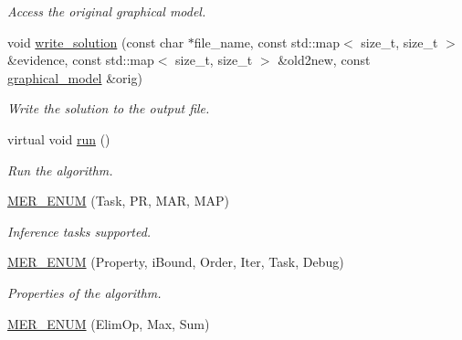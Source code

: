 \begin{DoxyCompactItemize}
\begin{DoxyCompactList}\small\item\em Access the original graphical model. \end{DoxyCompactList}\item 
void \hyperlink{classmerlin_1_1ijgp_a0054a84cdbf4d9c5d8c93fda1ae17c86}{write\+\_\+solution} (const char $\ast$file\+\_\+name, const std\+::map$<$ size\+\_\+t, size\+\_\+t $>$ \&evidence, const std\+::map$<$ size\+\_\+t, size\+\_\+t $>$ \&old2new, const \hyperlink{classmerlin_1_1graphical__model}{graphical\+\_\+model} \&orig)
\begin{DoxyCompactList}\small\item\em Write the solution to the output file. \end{DoxyCompactList}\item 
virtual void \hyperlink{classmerlin_1_1ijgp_ac255c416a80f2bddab2855e5f66df8bd}{run} ()
\begin{DoxyCompactList}\small\item\em Run the algorithm. \end{DoxyCompactList}\item 
\hyperlink{classmerlin_1_1ijgp_a34acc5c067c4ff887c5f40a2db5f2002}{M\+E\+R\+\_\+\+E\+N\+UM} (Task, PR, M\+AR, M\+AP)\hypertarget{classmerlin_1_1ijgp_a34acc5c067c4ff887c5f40a2db5f2002}{}\label{classmerlin_1_1ijgp_a34acc5c067c4ff887c5f40a2db5f2002}

\begin{DoxyCompactList}\small\item\em Inference tasks supported. \end{DoxyCompactList}\item 
\hyperlink{classmerlin_1_1ijgp_a49319b52721987bed9e9e62fe1e5d26c}{M\+E\+R\+\_\+\+E\+N\+UM} (Property, i\+Bound, Order, Iter, Task, Debug)\hypertarget{classmerlin_1_1ijgp_a49319b52721987bed9e9e62fe1e5d26c}{}\label{classmerlin_1_1ijgp_a49319b52721987bed9e9e62fe1e5d26c}

\begin{DoxyCompactList}\small\item\em Properties of the algorithm. \end{DoxyCompactList}\item 
\hyperlink{classmerlin_1_1ijgp_a185c745e26dbe2061d6d47631907098c}{M\+E\+R\+\_\+\+E\+N\+UM} (Elim\+Op, Max, Sum)\hypertarget{classmerlin_1_1ijgp_a185c745e26dbe2061d6d47631907098c}{}\label{classmerlin_1_1ijgp_a185c745e26dbe2061d6d47631907098c}


\end{DoxyCompactItemize}
